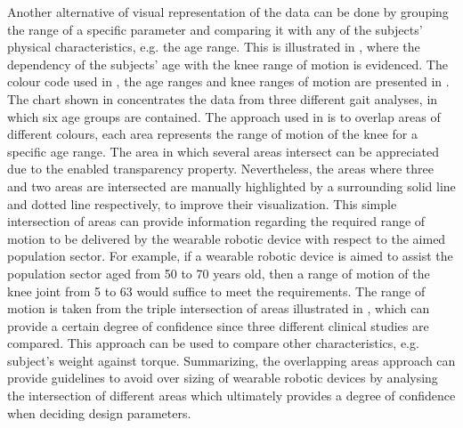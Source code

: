 Another alternative of visual representation of the data can be done by grouping the range of a specific parameter and comparing it with any of the subjects' physical characteristics, e.g. the age range. This is illustrated in , where the dependency of the subjects' age with the knee range of motion is evidenced. The colour code used in , the age ranges and knee ranges of motion are presented in . The chart shown in  concentrates the data from three different gait analyses, in which six age groups are contained. The approach used in  is to overlap areas of different colours, each area represents the range of motion of the knee for a specific age range. The area in which several areas intersect can be appreciated due to the enabled transparency property. Nevertheless, the areas where three and two areas are intersected are manually highlighted by a surrounding solid line and dotted line respectively, to improve their visualization. This simple intersection of areas can provide information regarding the required range of motion to be delivered by the wearable robotic device with respect to the aimed population sector.
For example, if a wearable robotic device is aimed to assist the population sector aged from 50 to 70 years old, then a range of motion of the knee joint from 5{\textdegree} to 63{\textdegree} would suffice to meet the requirements. The range of motion is taken from the triple intersection of areas illustrated in , which can provide a certain degree of confidence since three different clinical studies are compared. This approach can be used to compare other characteristics, e.g. subject's weight against torque. Summarizing, the overlapping areas approach can provide guidelines to avoid over sizing of wearable robotic devices by analysing the intersection of different areas which ultimately provides a degree of confidence when deciding design parameters.

